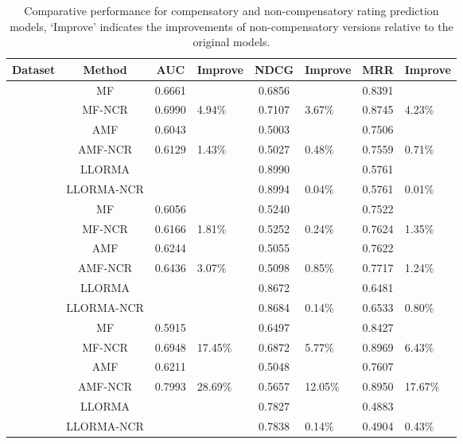 \documentclass[letterpaper]{article} %
\begin{document}
\begin{table}[htp]
\tiny
\caption{Comparative performance for compensatory and non-compensatory rating prediction models, `Improve' indicates the improvements of non-compensatory versions relative to the original models.}
\begin{center}
\begin{tabular}{|p{0.7cm}<{\centering}|c|c|p{0.5cm}<{\centering}|c|p{0.5cm}<{\centering}|c|p{0.5cm}<{\centering}|}
\hline
Dataset	& Method	& AUC	& Improve&	NDCG&	Improve&	MRR	&Improve\\\hline
{} &	MF	& 0.6661 	& &	0.6856 	&&	0.8391 	&\\
	&MF-NCR	&0.6990 &	4.94$\%$	&0.7107 	&3.67$\%$	&0.8745 &	4.23$\%$	\\
	&AMF&	0.6043 	&&	0.5003 	&&	0.7506 &\\
	&AMF-NCR	&0.6129 	&1.43$\%$	&0.5027 &	0.48$\%$	&0.7559 	&0.71$\%$	\\
	&LLORMA		&&	&0.8990 	&&	0.5761&\\	
	&LLORMA-NCR	&&&		0.8994 	&0.04$\%$	&0.5761 	&0.01$\%$	\\
	\hline
{}	&MF	&0.6056 	&&	0.5240 &&		0.7522 	&	\\
	&MF-NCR&	0.6166 	&1.81$\%$	&0.5252 	&0.24$\%$	&0.7624 	&1.35$\%$\\
	&AMF	&0.6244 	&&	0.5055 &&		0.7622 	&	\\
	&AMF-NCR	&0.6436 	&3.07$\%$	&0.5098 	&0.85$\%$	&0.7717 	&1.24$\%$	\\
	&LLORMA	&& &		0.8672 	&&	0.6481 	&	\\
	&LLORMA-NCR		&&&	0.8684 &	0.14$\%$	&0.6533 	&0.80$\%$	\\
	\hline
{}	&MF	&0.5915 	&&	0.6497 &	&	0.8427 &	\\
	&MF-NCR	&0.6948 	&17.45$\%$	&0.6872 	&5.77$\%$	&0.8969 	&6.43$\%$	\\
	&AMF	&0.6211 	&&	0.5048 	&&	0.7607 	&	\\
	&AMF-NCR	&0.7993 &	28.69$\%$	&0.5657 	&12.05$\%$	&0.8950 	&17.67$\%$	\\
	&LLORMA		&&	&0.7827 		&&0.4883 		& 	\\
	&LLORMA-NCR	&& &		0.7838 	&0.14$\%$	&0.4904 	&0.43$\%$	\\
	\hline
	\end{tabular}
\end{center}
\label{tab:ratingresult}
\end{table}%
\end{document}
